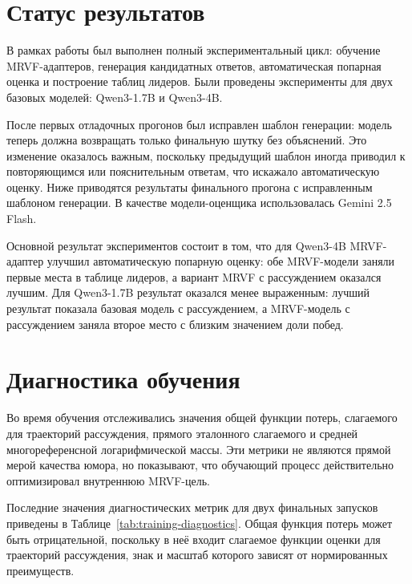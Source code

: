 \section{Статус результатов}

В рамках работы был выполнен полный экспериментальный цикл: обучение MRVF-адаптеров, генерация кандидатных ответов, автоматическая попарная оценка и построение таблиц лидеров. Были проведены эксперименты для двух базовых моделей: Qwen3-1.7B и Qwen3-4B.

После первых отладочных прогонов был исправлен шаблон генерации: модель теперь должна возвращать только финальную шутку без объяснений. Это изменение оказалось важным, поскольку предыдущий шаблон иногда приводил к повторяющимся или пояснительным ответам, что искажало автоматическую оценку. Ниже приводятся результаты финального прогона с исправленным шаблоном генерации. В качестве модели-оценщика использовалась Gemini 2.5 Flash.

Основной результат экспериментов состоит в том, что для Qwen3-4B MRVF-адаптер улучшил автоматическую попарную оценку: обе MRVF-модели заняли первые места в таблице лидеров, а вариант MRVF с рассуждением оказался лучшим. Для Qwen3-1.7B результат оказался менее выраженным: лучший результат показала базовая модель с рассуждением, а MRVF-модель с рассуждением заняла второе место с близким значением доли побед.

\section{Диагностика обучения}

Во время обучения отслеживались значения общей функции потерь, слагаемого для траекторий рассуждения, прямого эталонного слагаемого и средней многореференсной логарифмической массы. Эти метрики не являются прямой мерой качества юмора, но показывают, что обучающий процесс действительно оптимизировал внутреннюю MRVF-цель.

Последние значения диагностических метрик для двух финальных запусков приведены в Таблице~\ref{tab:training-diagnostics}. Общая функция потерь может быть отрицательной, поскольку в неё входит слагаемое функции оценки для траекторий рассуждения, знак и масштаб которого зависят от нормированных преимуществ.

